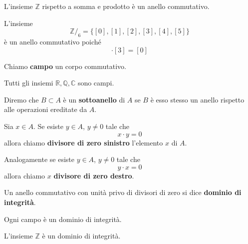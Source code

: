 \begin{example}
	L'insieme $\mathbb{Z}$ rispetto a somma e prodotto \`e un anello commutativo.
\end{example}

\begin{example}
	L'insieme
	\begin{equation*}
		\mathbb{Z}/_6 = \{ [0], [1], [2], [3], [4], [5] \}
	\end{equation*}
	\`e un anello commutativo poich\'e
	\begin{equation*}
		[2] \cdot [3] = [0]
	\end{equation*}
\end{example}

\begin{defn}
	Chiamo \textbf{campo} un corpo commutativo.
\end{defn}

\begin{example}
	Tutti gli insiemi $\mathbb{R}, \mathbb{Q}, \mathbb{C}$ sono campi.
\end{example}

\begin{defn}
	Diremo che $B \subset A$ \`e un \textbf{sottoanello} di $A$ se $B$ \`e esso stesso un
	anello rispetto alle operazioni ereditate da $A$.
\end{defn}

\begin{defn}
	Sia $x \in A$. Se esiste $y \in A$, $y \neq 0$ tale che
	\begin{equation*}
		x \cdot y = 0
	\end{equation*}
	allora chiamo \textbf{divisore di zero sinistro} l'elemento $x$ di $A$.

	Analogamente se esiste $y \in A$, $y \neq 0$ tale che
	\begin{equation*}
		y \cdot x = 0
	\end{equation*}
	allora chiamo $x$ \textbf{divisore di zero destro}.
\end{defn}

\begin{defn}
	Un anello commutativo con unit\`a privo di divisori di zero si dice
	\textbf{dominio	di integrit\`a}.
\end{defn}

\begin{proposition}
	Ogni campo \`e un dominio di integrit\`a.
\end{proposition}

\begin{example}
	L'insieme $\mathbb{Z}$ \`e un dominio di integrit\`a.
\end{example}


